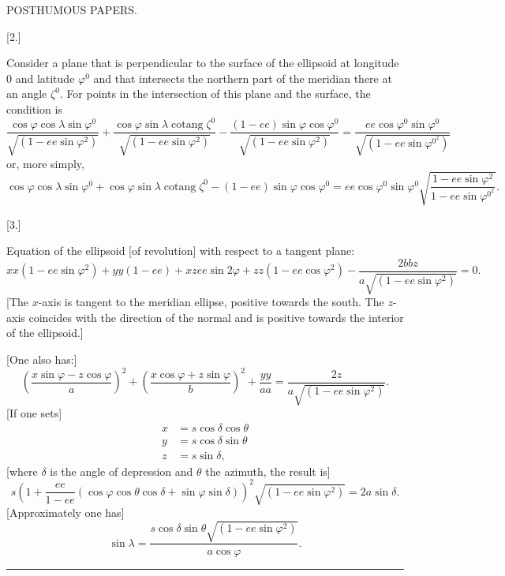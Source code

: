 \clearpage
{}\hfill POSTHUMOUS PAPERS.\hfill\mbox{}\par
\begin{center}[2.]\par
[Equation of the vertical plane of the ellipsoid of revolution.]\end{center}
Consider a plane that is perpendicular to the surface of the ellipsoid at longitude $0$ and latitude
$\varphi^0$ and that intersects the northern part of the meridian there at an angle
$\zeta^0$. For points in the intersection of this plane and the surface, the condition is
\[
\frac{\cos\varphi\cos\lambda\sin\varphi^0}{\sqrt{(1-ee\sin\varphi^2)}}+\frac{\cos\varphi\sin\lambda\operatorname{cotang}\zeta^0}{\sqrt{(1-ee\sin\varphi^2)}}-\frac{(1-ee)\sin\varphi\cos\varphi^0}{\sqrt{(1-ee\sin\varphi^2)}}=\frac{ee\cos\varphi^0\sin\varphi^0}{\sqrt{(1-ee\sin\varphi^{0^2})}}
\]
or, more simply,
\[
\cos\varphi\cos\lambda\sin\varphi^0+\cos\varphi\sin\lambda\operatorname{cotang}\zeta^0-(1-ee)\sin\varphi\cos\varphi^0=ee\cos\varphi^0\sin\varphi^0\sqrt{\frac{1-ee\sin\varphi^2}{1-ee\sin\varphi^{0^2}}}.
\]
\begin{center}[3.]\end{center}
Equation of the ellipsoid [of revolution] with respect to a tangent plane:
\[
xx(1-ee\sin\varphi^2)+yy(1-ee)+xzee\sin2\varphi+zz(1-ee\cos\varphi^2)-\frac{2bbz}{a\sqrt{(1-ee\sin\varphi^2)}}=0.
\]
[The $x$-axis is tangent to the meridian ellipse, positive towards the south. The $z$-axis
coincides with the direction of the normal and is positive towards the interior of the ellipsoid.]

[One also has:]
\[
\left(\frac{x\sin\varphi-z\cos\varphi}{a}\right)^2+\left(\frac{x\cos\varphi+z\sin\varphi}{b}\right)^2+\frac{yy}{aa}=\frac{2z}{a\sqrt{(1-ee\sin\varphi^2)}}.
\]
[If one sets]
\[
\begin{aligned}
x&=s\cos\delta\cos\theta\\
y&=s\cos\delta\sin\theta\\
z&=s\sin\delta,
\end{aligned}
\]
[where $\delta$ is the angle of depression and $\theta$ the azimuth, the result is]
\[
s\left(1+\frac{ee}{1-ee}(\cos\varphi\cos\theta\cos\delta+\sin\varphi\sin\delta)\right)^2\sqrt{(1-ee\sin\varphi^2)}=2a\sin\delta.
\]
[Approximately one has]
\[
\sin\lambda=\frac{s\cos\delta\sin\theta\sqrt{(1-ee\sin\varphi^2)}}{a\cos\varphi}.
\]
\begin{center}\rule{.18\textwidth}{.4pt}\end{center}

